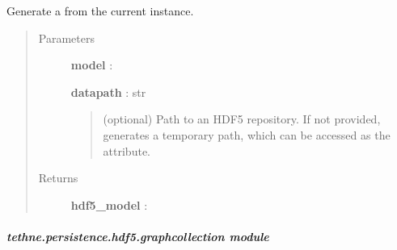 \documentclass[letterpaper,10pt,english]{sphinxmanual}
\begin{document}
\begin{fulllineitems}
\label{tethne.persistence.hdf5.dtmmodel:tethne.persistence.hdf5.dtmmodel.to_hdf5}
Generate a {\hyperref[tethne.persistence.hdf5.dtmmodel:tethne.persistence.hdf5.dtmmodel.HDF5DTMModel]{}} from the current instance.
\begin{quote}\begin{description}
\item[{Parameters}] \leavevmode
\textbf{model} : {\hyperref[tethne.model.corpus.dtmmodel:tethne.model.corpus.dtmmodel.DTMModel]{}}

\textbf{datapath} : str
\begin{quote}

(optional) Path to an HDF5 repository. If not provided, generates
a temporary path, which can be accessed as the  attribute.
\end{quote}

\item[{Returns}] \leavevmode
\textbf{hdf5\_model} : {\hyperref[tethne.persistence.hdf5.dtmmodel:tethne.persistence.hdf5.dtmmodel.HDF5DTMModel]{}}

\end{description}\end{quote}

\end{fulllineitems}



\subparagraph{tethne.persistence.hdf5.graphcollection module}
\label{tethne.persistence.hdf5.graphcollection:tethne-persistence-hdf5-graphcollection-module}\label{tethne.persistence.hdf5.graphcollection::doc}\label{tethne.persistence.hdf5.graphcollection:module-tethne.persistence.hdf5.graphcollection}
\end{document}
